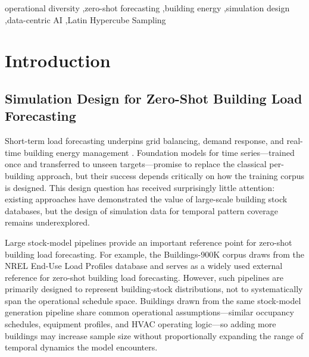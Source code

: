 \documentclass[preprint,12pt,authoryear]{elsarticle}
\begin{document}
\begin{frontmatter}
\begin{abstract}
We instantiate this interpretation through 700 EnergyPlus simulations (50 per archetype $\times$ 14 types) with Latin Hypercube Sampling, combined with RevIN and data augmentation to train a Transformer-based forecasting model. Controlled experiments are broadly consistent with the four expectations: in a controlled single-subset comparison, the designed dataset outperforms an equal-size stock-model sample by 1.33 percentage points; N-scaling plateaus near $n \approx 5$ per archetype; RevIN improves LHS-designed data but degrades stock-model data; and residential forecasting remains weak when training covers only commercial operating regimes. These results support a data-centric view of zero-shot building energy forecasting in which simulation design may matter as much as corpus size.
\end{abstract}

\begin{keyword}
operational diversity \sep zero-shot forecasting \sep building energy \sep simulation design \sep data-centric AI \sep Latin Hypercube Sampling
\end{keyword}

\end{frontmatter}

\section{Introduction}
\label{sec:intro}

\subsection{Simulation Design for Zero-Shot Building Load Forecasting}

Short-term load forecasting underpins grid balancing, demand response, and real-time building energy management \citep{Fan2017,Hong2019}. Foundation models for time series---trained once and transferred to unseen targets---promise to replace the classical per-building approach, but their success depends critically on how the training corpus is designed. This design question has received surprisingly little attention: existing approaches have demonstrated the value of large-scale building stock databases, but the design of simulation data for temporal pattern coverage remains underexplored.

Large stock-model pipelines provide an important reference point for zero-shot building load forecasting. For example, the Buildings-900K corpus \citep{Wilson2022,Emami2023} draws from the NREL End-Use Load Profiles database and serves as a widely used external reference for zero-shot building load forecasting. However, such pipelines are primarily designed to represent building-stock distributions, not to systematically span the operational schedule space. Buildings drawn from the same stock-model generation pipeline share common operational assumptions---similar occupancy schedules, equipment profiles, and HVAC operating logic---so adding more buildings may increase sample size without proportionally expanding the range of temporal dynamics the model encounters.
\end{document}
